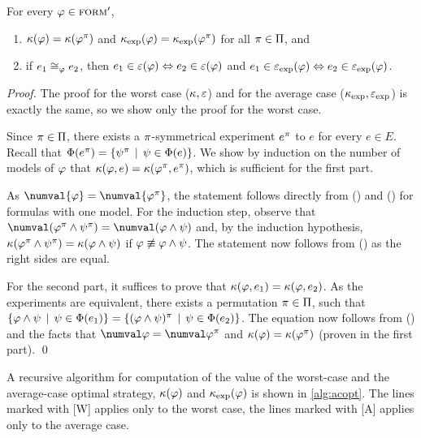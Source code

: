 \begin{theorem}
For every $\varphi\in{\textsc{form}'}$,
\begin{enumerate}
\item $\kappa(\varphi) = \kappa(\varphi^\pi)$ and $\kappa_\textrm{exp}(\varphi) = \kappa_\textrm{exp}(\varphi^\pi)$ for all $\pi\in\Pi$, and
\item if $e_1\cong_{\varphi} e_2$, then $e_1\in\varepsilon(\varphi) \Leftrightarrow e_2\in\varepsilon(\varphi)$ and
  $e_1\in\varepsilon_\textrm{exp}(\varphi) \Leftrightarrow e_2\in\varepsilon_\textrm{exp}(\varphi)$.
\end{enumerate}
\end{theorem}

\begin{proof}
The proof for the worst case ($\kappa, \varepsilon$)
  and for the average case ($\kappa_\textrm{exp}, \varepsilon_\textrm{exp}$) is exactly the same,
  so we show only the proof for the worst case.

Since $\pi\in\Pi$, there exists a $\pi$-symmetrical experiment $e^\pi$
  to $e$ for every $e\in E$.
Recall that $\Phi(e^\pi) = \{ \psi^\pi \:\:|\:\: \psi\in\Phi(e)\}$.
We show by induction on the number of models of $\varphi$
  that $\kappa(\varphi, e) = \kappa(\varphi^\pi, e^\pi)$,
  which is sufficient for the first part.

As $\numval{\form} = \numval{\form^\perm}$, the statement follows directly from
  () and () for formulas with one model.
For the induction step, observe that
  $\numval(\form^\perm \wedge \formx^\perm) = \numval(\form\wedge\formx)$
  and, by the induction hypothesis,
  $\kappa(\varphi^\pi \wedge \psi^\pi) = \kappa(\varphi\wedge\psi)$
  if $\varphi \not\equiv \varphi\wedge\psi$.
The statement now follows from ()
  as the right sides are equal.

For the second part, it suffices to prove that
  $\kappa(\varphi, e_1) = \kappa(\varphi, e_2)$.
As the experiments are equivalent, there exists a permutation $\pi\in\Pi$,
 such that
 $\{\varphi\wedge\psi \:\:|\:\:\psi\in\Phi(e_1)\} =
 \{(\varphi\wedge\psi)^\pi \:\:|\:\:\psi\in\Phi(e_2)\}$.
The equation now follows from () and the facts that
 $\numval\form=\numval\form^\perm$ and $\kappa(\varphi) = \kappa(\varphi^\pi)$
 (proven in the first part). \qed
\end{proof}

A recursive algorithm for computation of the value
  of the worst-case and the average-case optimal strategy,
  $\kappa(\varphi)$ and $\kappa_\textrm{exp}(\varphi)$ is shown in \autoref{alg:acopt}.
The lines marked with [W] applies only to the worst case,
  the lines marked with [A] applies only to the average case.

